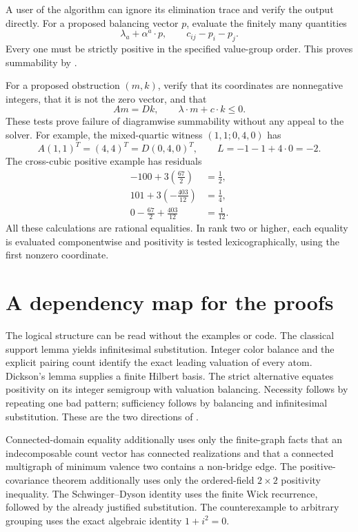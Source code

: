 \documentclass[11pt,letterpaper]{article}
\numberwithin{equation}{section}
\theoremstyle{definition}
\theoremstyle{remark}
\begin{document}
A user of the algorithm can ignore its elimination trace and verify the
output directly. For a proposed balancing vector $p$, evaluate the finitely
many quantities
\[
 \lambda_a+\alpha^a\cdot p,\qquad c_{ij}-p_i-p_j.
\]
Every one must be strictly positive in the specified value-group order.
This proves summability by .

For a proposed obstruction $(m,k)$, verify that its coordinates are
nonnegative integers, that it is not the zero vector, and that
\[
 Am=Dk,\qquad \lambda\cdot m+c\cdot k\le0.
\]
These tests prove failure of diagramwise summability without any appeal to
the solver. For example, the mixed-quartic witness
$(1,1;0,4,0)$ has
\[
 A(1,1)^T=(4,4)^T=D(0,4,0)^T,
 \qquad L=-1-1+4\cdot0=-2.
\]
The cross-cubic positive example has residuals
\begin{align*}
 -100+3\left(\frac{67}{2}\right)&=\frac12,\\
 101+3\left(-\frac{403}{12}\right)&=\frac14,\\
 0-\frac{67}{2}+\frac{403}{12}&=\frac1{12}.
\end{align*}
All these calculations are rational equalities. In rank two or higher,
each equality is evaluated componentwise and positivity is tested
lexicographically, using the first nonzero coordinate.

\section{A dependency map for the proofs}
\label{wick:app:dependencies}

The logical structure can be read without the examples or code. The
classical support lemma yields infinitesimal substitution. Integer color
balance and the explicit pairing count identify the exact leading
valuation of every atom. Dickson's lemma supplies a finite Hilbert basis.
The strict alternative equates positivity on its integer semigroup with
valuation balancing. Necessity follows by repeating one bad pattern;
sufficiency follows by balancing and infinitesimal substitution. These are
the two directions of .

Connected-domain equality additionally uses only the finite-graph facts
that an indecomposable count vector has connected realizations and that a
connected multigraph of minimum valence two contains a non-bridge edge.
The positive-covariance theorem additionally uses only the ordered-field
$2\times2$ positivity inequality. The Schwinger--Dyson identity uses the
finite Wick recurrence, followed by the already justified substitution.
The counterexample to arbitrary grouping uses the exact algebraic identity
$1+i^2=0$.
\end{document}
